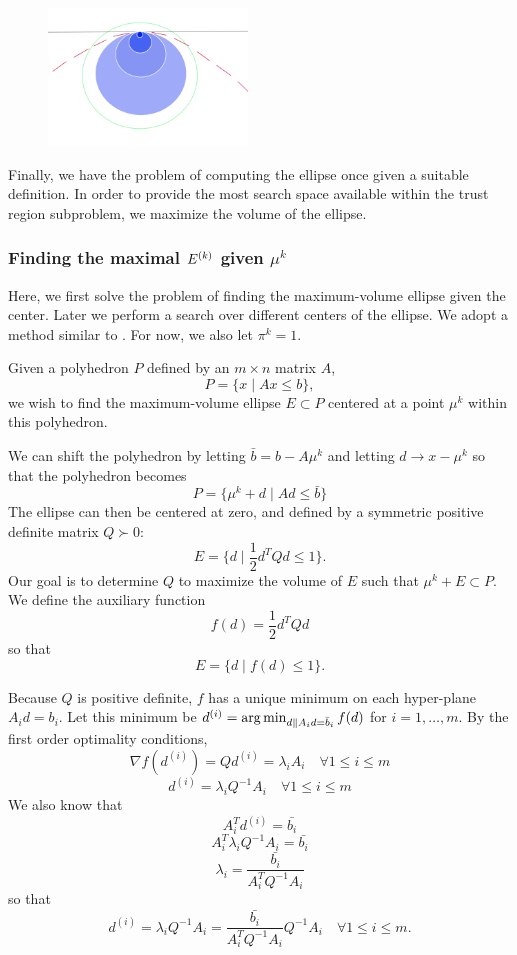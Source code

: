 \begin{figure}[h]
    \centering
    \includegraphics[width=200px]{images/second_order_critical_point.png}
    \label{fbns}
\end{figure}



Finally, we have the problem of computing the ellipse once given a suitable definition.
In order to provide the most search space available within the trust region subproblem, we maximize the volume of the ellipse.

\subsubsection{Finding the maximal $ {E^{(k)}} $ given $\mu^k$}

\label{ellipse_optimization}

Here, we first solve the problem of finding the maximum-volume ellipse given the center.
Later we perform a search over different centers of the ellipse.
We adopt a method similar to \cite{Khachiyan1993}.
For now, we also let $\pi^k = 1$.

Given a polyhedron $P$ defined by an $m \times n$ matrix $A$,
\[
P = \{ x \; | \;  Ax \le b \},
\]
we wish to find the maximum-volume ellipse $E \subset P$ centered at a point $\mu^{k}$ within this polyhedron.

We can shift the polyhedron by letting $\bar{b} = b - A\mu^{k}$ and letting $d \to x - \mu^{k}$ so that the polyhedron becomes
\[
P = \{ \mu^k + d \; | \;  Ad \le \bar{b} \}
\]
The ellipse can then be centered at zero, and defined by a symmetric positive definite matrix $Q \succ 0$:
\[
E = \{ d \; | \; \frac 1 2 d^T Q d \le 1 \}.
\]
Our goal is to determine $Q$ to maximize the volume of $E$ such that $\mu^{k} + E \subset P$.
We define the auxiliary function 
\[
f(d) = \frac 1 2 d^T Q d
\]
so that 
\[
E = \{ d \; | \; f(d) \le 1 \}.
\]

Because $Q$ is positive definite, $f$ has a unique minimum on each hyper-plane $A_i d = b_i$.
Let this minimum be $d^{(i)} = \operatorname*{arg\,min}_{d\| A_id =\bar{b}_i} f(d)$ for $i=1,\ldots,m$.
By the first order optimality conditions,
\[
\nabla f(d^{(i)}) = Q d^{(i)} = \lambda_i A_i \quad \forall 1\le i\le m
\]
\[
d^{(i)} = \lambda_i Q^{-1}A_i \quad \forall 1\le i\le m
\]
We also know that 
\[
A_i^T d^{(i)} = \bar{b_i}
\]
\[
A_i^T \lambda_i Q^{-1}A_i = \bar{b_i}
\]
\[
\lambda_i = \frac {\bar{b_i}}{A_i^T  Q^{-1}A_i}
\]
so that 
\[
d^{(i)} = \lambda_i Q^{-1}A_i = \frac {\bar{b_i}}{A_i^T  Q^{-1}A_i}  Q^{-1}A_i \quad \forall 1\le i\le m.
\]

